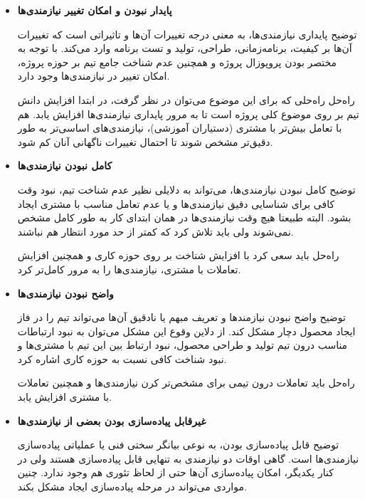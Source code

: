 \begin{itemize}
	
	\item
	\textbf{پایدار نبودن و امکان تغییر نیازمندی‌ها}
	
	
	توضیح \hspace*{1cm}  پایداری نیازمندی‌ها، به معنی درجه تغییرات آن‌ها و تاثیراتی است که تغییرات آن‌ها بر کیفیت، برنامه‌زمانی، طراحی، تولید و تست برنامه وارد می‌کند. با توجه به مختصر بودن پروپوزال پروژه و همچنین عدم شناخت جامع تیم بر حوزه پروژه،‌ امکان تغییر در نیازمندی‌ها وجود دارد.
	
	
	راه‌حل \hspace*{1cm}  راه‌حلی که برای این موضوع می‌توان در نظر گرفت، در ابتدا افزایش دانش تیم بر روی موضوع کلی پروژه است تا به مرور پایداری نیاز‌مندی‌ها افزایش یابد. هم با تعامل بیش‌تر با مشتری (دستیاران آموزشی)، نیازمندی‌های اساسی‌تر به طور دقیق‌تر مشخص شوند تا احتمال تغییرات ناگهانی آنان کم شود.
	
	\item 
\textbf{کامل نبودن نیازمندی‌ها}
	
	توضیح \hspace*{1cm}  
	کامل نبودن نیازمندی‌ها،  می‌تواند به دلایلی نظیر عدم شناخت تیم، نبود وقت‌ کافی برای شناسایی دقیق نیازمندی‌ها و یا عدم تعامل مناسب با مشتری ایجاد بشود. البته طبیعتا هیچ‌ وقت نیازمندی‌ها در همان ابتدای کار به طور کامل مشخص نمی‌شوند ولی باید تلاش کرد که کمتر از حد مورد انتظار هم نباشند.
	
	راه‌حل \hspace*{1cm}  باید سعی کرد با افزایش شناخت بر روی حوزه کاری و همچنین افزایش تعاملات با مشتری، نیازمندی‌ها را به مرور کامل‌تر کرد.
	
	\item 
	\textbf{واضح نبودن نیازمندی‌ها}
	
	
	توضیح \hspace*{1cm}  
واضح نبودن نیازمند‌ها و تعریف مبهم یا نادقیق ‌آن‌ها می‌تواند تیم را در فاز ایجاد محصول دچار مشکل کند. از دلاین وقوع این مشکل می‌توان به نبود ارتباطات مناسب درون تیم تولید و طراحی محصول، نبود ارتباط بین این تیم با مشتری‌ها و نبود شناخت کافی نسبت به حوزه کاری اشاره کرد.
	
	راه‌حل \hspace*{1cm}  باید تعاملات درون تیمی برای مشخص‌تر کرن نیازمندی‌ها و همچنین تعاملات با مشتری افزایش یابد.
	
	\item 
	\textbf{غیرقابل پیاده‌سازی بودن بعضی از نیازمندی‌ها}
	
		توضیح \hspace*{1cm}  
	قابل پیاده‌سازی بودن، به نوعی بیانگر سختی فنی یا عملیاتی پیاده‌سازی نیازمندی‌ها است. گاهی اوقات دو نیازمندی به تنهایی قابل پیاده‌سازی هستند ولی در کنار یکدیگر، امکان پیاده‌سازی آن‌ها حتی از لحاظ تئوری هم وجود ندارد. چنین مواردی می‌تواند در مرحله پیاده‌سازی ایجاد مشکل بکند.
	

\end{itemize}
